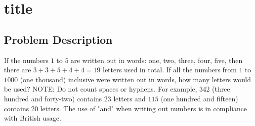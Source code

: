 \chapter{title}
\section{Problem Description}
\begin{tcolorbox}
If the numbers $1$ to $5$ are written out in words: one, two, three, four, five, then there are $3 + 3 + 5 + 4 + 4 = 19$ letters used in total.
If all the numbers from $1$ to $1000$ (one thousand) inclusive were written out in words, how many letters would be used? 
NOTE: Do not count spaces or hyphens. For example, $342$ (three hundred and forty-two) contains $23$ letters and $115$ (one hundred and fifteen) contains $20$ letters. The use of "and" when writing out numbers is in compliance with British usage.
\end{tcolorbox}
		
